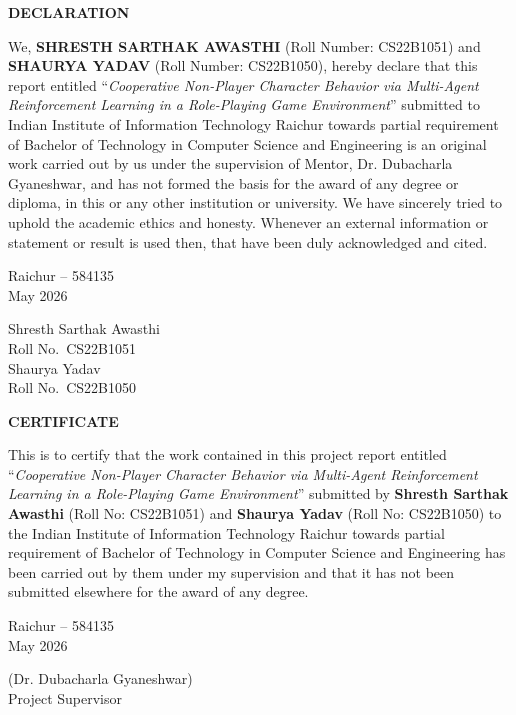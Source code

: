 \documentclass[12pt, a4paper, oneside]{report}
\newcommand{\thesisTitle}{Cooperative Non-Player Character Behavior via Multi-Agent Reinforcement Learning in a Role-Playing Game Environment}
\newcommand{\studentNameA}{Shresth Sarthak Awasthi}
\newcommand{\rollNumberA}{CS22B1051}
\newcommand{\studentNameB}{Shaurya Yadav}
\newcommand{\rollNumberB}{CS22B1050}
\newcommand{\supervisorName}{Dr. Dubacharla Gyaneshwar}
\newcommand{\departmentName}{Computer Science and Engineering}
\newcommand{\submissionMonthYear}{May 2026}
\newcommand{\submissionLocation}{Raichur -- 584135}
\newcommand{\degreeName}{Bachelor of Technology}
\newcommand{\frontmatterheading}[1]{%
  \begin{center}\Large\bfseries #1\end{center}
  \vspace{0.5cm}
}
\begin{document}
\setcounter{page}{2}

\clearpage
\thispagestyle{plain}
\frontmatterheading{DECLARATION}

\noindent We, \textbf{\MakeUppercase{\studentNameA}} (Roll Number: \rollNumberA)
and \textbf{\MakeUppercase{\studentNameB}} (Roll Number: \rollNumberB), hereby
declare that this report entitled ``\textit{\thesisTitle}'' submitted to
Indian Institute of Information Technology Raichur towards partial requirement
of \degreeName{} in \departmentName{} is an original work carried out by us
under the supervision of Mentor, \supervisorName{}, and has not formed the
basis for the award of any degree or diploma, in this or any other institution
or university. We have sincerely tried to uphold the academic ethics and
honesty. Whenever an external information or statement or result is used then,
that have been duly acknowledged and cited.

\vspace{2.5cm}
\noindent
\begin{minipage}[t]{0.5\textwidth}
\submissionLocation \\
\submissionMonthYear
\end{minipage}
\hfill
\begin{minipage}[t]{0.4\textwidth}
\raggedleft
\studentNameA \\
Roll No.~\rollNumberA \\[1em]
\studentNameB \\
Roll No.~\rollNumberB
\end{minipage}

\clearpage
\thispagestyle{plain}
\frontmatterheading{CERTIFICATE}

\noindent This is to certify that the work contained in this project report
entitled ``\textit{\thesisTitle}'' submitted by \textbf{\studentNameA} (Roll
No: \rollNumberA) and \textbf{\studentNameB} (Roll No: \rollNumberB) to the
Indian Institute of Information Technology Raichur towards partial requirement
of \degreeName{} in \departmentName{} has been carried out by them under my
supervision and that it has not been submitted elsewhere for the award of any
degree.

\vspace{3cm}
\noindent
\begin{minipage}[t]{0.5\textwidth}
\submissionLocation \\
\submissionMonthYear
\end{minipage}
\hfill
\begin{minipage}[t]{0.4\textwidth}
\raggedleft
(\supervisorName) \\
Project Supervisor
\end{minipage}
\end{document}
